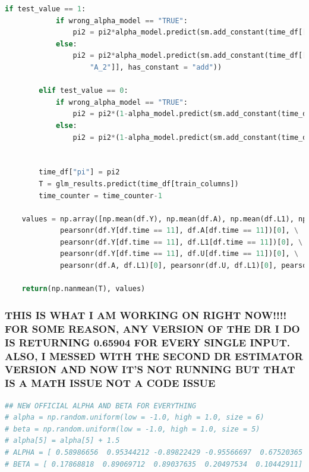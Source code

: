 \begin{lstlisting}[language=Python]
        if test_value == 1: 
            if wrong_alpha_model == "TRUE":
                pi2 = pi2*alpha_model.predict(sm.add_constant(time_df[["L1_3", "A_3"]], has_constant = "add"))
            else:
                pi2 = pi2*alpha_model.predict(sm.add_constant(time_df[["L1", "L1_1", "A_1", \
                    "A_2"]], has_constant = "add"))
        
        elif test_value == 0: 
            if wrong_alpha_model == "TRUE":
                pi2 = pi2*(1-alpha_model.predict(sm.add_constant(time_df[["L1_3", "A_3"]], has_constant = "add")))
            else:
                pi2 = pi2*(1-alpha_model.predict(sm.add_constant(time_df[["L1", "L1_1", "A_1", "A_2"]], has_constant = "add")))
            

        time_df["pi"] = pi2
        T = glm_results.predict(time_df[train_columns])
        time_counter = time_counter-1
    
    values = np.array([np.mean(df.Y), np.mean(df.A), np.mean(df.L1), np.mean(df.U), \
             pearsonr(df.Y[df.time == 11], df.A[df.time == 11])[0], \
             pearsonr(df.Y[df.time == 11], df.L1[df.time == 11])[0], \
             pearsonr(df.Y[df.time == 11], df.U[df.time == 11])[0], \
             pearsonr(df.A, df.L1)[0], pearsonr(df.U, df.L1)[0], pearsonr(df.A, df.U)[0]])
    
    return(np.nanmean(T), values)  
\end{lstlisting}

\subsubsection{THIS IS WHAT I AM WORKING ON RIGHT NOW!!!! FOR SOME
REASON, ANY VERSION OF THE DR I DO IS RETURNING 0.65904 FOR EVERY SINGLE
INPUT. ALSO, I MESSED WITH THE SECOND DR ESTIMATOR VERSION AND NOW IT'S
NOT RUNNING BUT THAT IS A MATH ISSUE NOT A CODE
ISSUE}\label{this-is-what-i-am-working-on-right-now-for-some-reason-any-version-of-the-dr-i-do-is-returning-0.65904-for-every-single-input.-also-i-messed-with-the-second-dr-estimator-version-and-now-its-not-running-but-that-is-a-math-issue-not-a-code-issue}

\begin{lstlisting}[language=Python]
## NEW OFFICIAL ALPHA AND BETA FOR EVERYTHING 
# alpha = np.random.uniform(low = -1.0, high = 1.0, size = 6)
# beta = np.random.uniform(low = -1.0, high = 1.0, size = 5)
# alpha[5] = alpha[5] + 1.5
# ALPHA = [ 0.58986656  0.95344212 -0.89822429 -0.95566697  0.67520365  2.46365403]
# BETA = [ 0.17868818  0.89069712  0.89037635  0.20497534  0.10442911]
\end{lstlisting}

